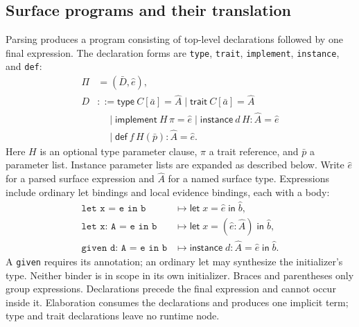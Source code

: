 \documentclass[10pt,a4paper]{article}
\newcommand{\letin}[3]{\mathsf{let}\;#1=#2\;\mathsf{in}\;#3}
\newcommand{\instancelet}[4]{\mathsf{instance}\;#1:#2=#3\;\mathsf{in}\;#4}
\newcommand{\kw}[1]{\mathsf{#1}}
\begin{document}
\newpage
\subsection{Surface programs and their translation}
\label{sec:syntax}
Parsing produces a program consisting of top-level declarations followed by one
final expression. The declaration forms are \texttt{type}, \texttt{trait},
\texttt{implement}, \texttt{instance}, and \texttt{def}:
\[
\begin{aligned}
 \Pi&=(\bar D,\hat e),\\
 D&::=\kw{type}\ C[\bar a]=\hat A
       \mid\kw{trait}\ C[\bar a]=\hat A\\
  &\quad\mid\kw{implement}\ H\,\pi=\hat e
       \mid\kw{instance}\ d\,H:\hat A=\hat e\\
  &\quad\mid\kw{def}\ f\,H(\bar p):\hat A=\hat e.
\end{aligned}
\]
Here $H$ is an optional type parameter clause, $\pi$ a trait reference, and
$\bar p$ a parameter list. Instance parameter lists are expanded as described below.
Write $\hat e$ for a parsed surface expression and $\hat A$ for a named surface type.
Expressions include ordinary let bindings and local evidence bindings, each with a body:
\[
\begin{aligned}
\texttt{let x = e in b}&\longmapsto\letin{x}{\hat e}{\hat b},\\
\texttt{let x: A = e in b}&\longmapsto\letin{x}{(\hat e:\hat A)}{\hat b},\\
\texttt{given d: A = e in b}&\longmapsto\instancelet{d}{\hat A}{\hat e}{\hat b}.
\end{aligned}
\]
A \texttt{given} requires its annotation; an ordinary let may synthesize the initializer's
type. Neither binder is in scope in its own initializer. Braces and parentheses only
group expressions. Declarations precede the final expression and cannot occur inside it.
Elaboration consumes the declarations and produces one implicit term; type and trait
declarations leave no runtime node.
\end{document}
